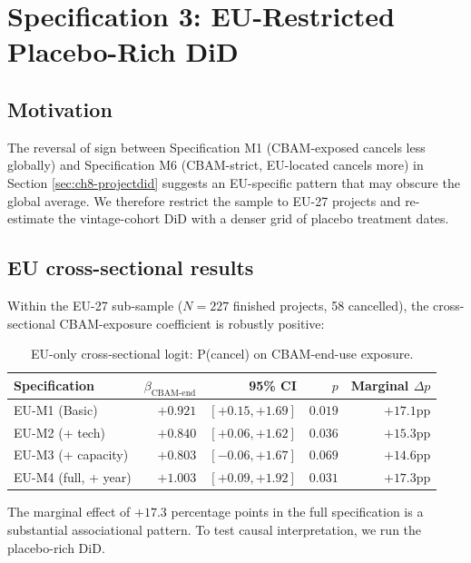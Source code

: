 \documentclass[11pt,a4paper]{article}
\begin{document}
\section{Specification 3: EU-Restricted Placebo-Rich DiD}
\label{sec:ch8-eudid}

\subsection{Motivation}

The reversal of sign between Specification M1 (CBAM-exposed cancels less globally) and Specification M6 (CBAM-strict, EU-located cancels more) in Section \ref{sec:ch8-projectdid} suggests an EU-specific pattern that may obscure the global average. We therefore restrict the sample to EU-27 projects and re-estimate the vintage-cohort DiD with a denser grid of placebo treatment dates.

\subsection{EU cross-sectional results}

Within the EU-27 sub-sample ($N = 227$ finished projects, 58 cancelled), the cross-sectional CBAM-exposure coefficient is robustly positive:

\begin{table}[ht]
\centering
\caption{EU-only cross-sectional logit: P(cancel) on CBAM-end-use exposure.}
\label{tab:ch8-eu-cross}
\begin{tabular}{lrrrr}
\toprule
Specification & $\beta_{\text{CBAM-end}}$ & 95\% CI & $p$ & Marginal $\Delta p$ \\
\midrule
EU-M1 (Basic)         & $+0.921$ & $[+0.15, +1.69]$ & $0.019$ & $+17.1$pp \\
EU-M2 (+ tech)        & $+0.840$ & $[+0.06, +1.62]$ & $0.036$ & $+15.3$pp \\
EU-M3 (+ capacity)    & $+0.803$ & $[-0.06, +1.67]$ & $0.069$ & $+14.6$pp \\
EU-M4 (full, + year)  & $+1.003$ & $[+0.09, +1.92]$ & $0.031$ & $+17.3$pp \\
\bottomrule
\end{tabular}
\end{table}

The marginal effect of $+17.3$ percentage points in the full specification is a substantial associational pattern. To test causal interpretation, we run the placebo-rich DiD.
\end{document}
